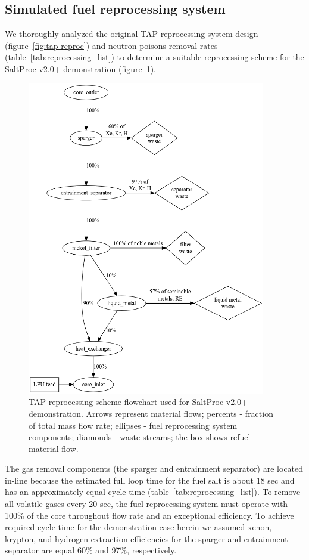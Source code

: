 \documentclass[12pt]{article} %
\begin{document}
\subsection{Simulated fuel reprocessing system}
We thoroughly analyzed the original \gls{TAP} reprocessing system design 
(figure~\ref{fig:tap-reproc}) and neutron poisons removal rates 
(table~\ref{tab:reprocessing_list}) to determine a suitable reprocessing 
scheme for the SaltProc v2.0+ demonstration 
(figure~\ref{fig:demo-repro-scheme}).
\begin{figure}[htp!] %
  \centering
		  \includegraphics[width=0.93\textwidth]{demo_reprocessing_scheme.png}
  \caption{\gls{TAP} reprocessing scheme flowchart used for SaltProc v2.0+ 
  demonstration. Arrows represent material flows; percents - fraction of total 
  mass flow rate; ellipses - fuel reprocessing system 
  components; diamonds - waste streams; the box shows refuel material flow.}
  \label{fig:demo-repro-scheme}
\end{figure}

The gas removal components (the sparger and entrainment separator) are located 
in-line because the estimated full loop time for the fuel salt is about 
18 sec and has an approximately equal cycle time 
(table~\ref{tab:reprocessing_list}). 
To remove all volatile gases every 20 sec, the fuel reprocessing system must 
operate with 100\% of the core throughout flow rate and an exceptional 
efficiency. To achieve required cycle time for the demonstration case herein 
we assumed xenon, krypton, and hydrogen extraction efficiencies for the 
sparger and entrainment separator are equal 60\% and 97\%, respectively.
\end{document}
